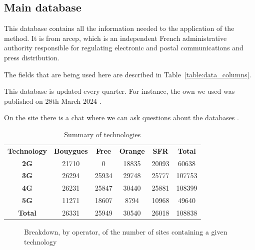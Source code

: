 \documentclass[lettersize,journal,english]{IEEEtran}
\begin{document}
    \subsection{Main database}
    This database \cite{main_database} contains all the information needed to the application of the method. It is from
    \acrfull{arcep}, which is an independent French administrative authority responsible for regulating electronic and postal communications and press distribution.

    The fields that are being used here are described in Table~\ref{table:data_columns}.

    This database is updated every quarter. For instance, the own we used was published on 28th March 2024 \cite{main_database_hist}.

    On the site there is a chat where we can ask questions about the databases \cite{main_database_chat}.

    \begin{table}[!b]
        \centering
        \caption{Summary of technologies}
        \label{table:techno_numbers}
        \begin{tabular}{cccccc}
            \toprule
            \textbf{Technology} & \textbf{Bouygues} & \textbf{Free} & \textbf{Orange} & \textbf{SFR} & \textbf{Total} \\
            \cmidrule(lr){1-6}
            \textbf{2G} & 21710 & 0 & 18835 & 20093 & 60638 \\
            \textbf{3G} & 26294 & 25934 & 29748 & 25777 & 107753 \\
            \textbf{4G} & 26231 & 25847 & 30440 & 25881 & 108399 \\
            \textbf{5G} & 11271 & 18607 & 8794 & 10968 & 49640 \\
            \textbf{Total} & 26331 & 25949 & 30540 & 26018 & 108838 \\
            \bottomrule
        \end{tabular}
    \end{table}

    \begin{figure}[!t]
        \centering
        \caption{Breakdown, by operator, of the number of sites containing a given technology}
        \label{fig:data_technos}
    \end{figure}
\end{document}
